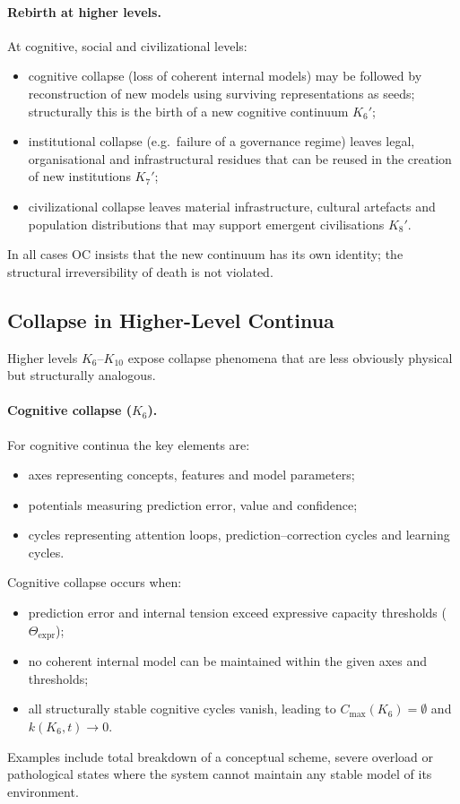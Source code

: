 \paragraph{Rebirth at higher levels.}
At cognitive, social and civilizational levels:
\begin{itemize}
  \item cognitive collapse (loss of coherent internal models) may be followed
        by reconstruction of new models using surviving representations as
        seeds; structurally this is the birth of a new cognitive continuum
        \(K_6'\);
  \item institutional collapse (e.g.\ failure of a governance regime) leaves
        legal, organisational and infrastructural residues that can be reused
        in the creation of new institutions \(K_7'\);
  \item civilizational collapse leaves material infrastructure, cultural
        artefacts and population distributions that may support emergent
        civilisations \(K_8'\).
\end{itemize}

In all cases OC insists that the new continuum has its own identity; the
structural irreversibility of death is not violated.

\subsection{Collapse in Higher-Level Continua}

Higher levels \(K_6\)–\(K_{10}\) expose collapse phenomena that are less
obviously physical but structurally analogous.

\paragraph{Cognitive collapse (\texorpdfstring{\(K_6\)}{K_6}).}
For cognitive continua the key elements are:
\begin{itemize}
  \item axes representing concepts, features and model parameters;
  \item potentials measuring prediction error, value and confidence;
  \item cycles representing attention loops, prediction--correction cycles
        and learning cycles.
\end{itemize}
Cognitive collapse occurs when:
\begin{itemize}
  \item prediction error and internal tension exceed expressive capacity
        thresholds (\(\Theta_{\mathrm{expr}}\));
  \item no coherent internal model can be maintained within the given axes
        and thresholds;
  \item all structurally stable cognitive cycles vanish, leading to
        \(C_{\max}(K_6)=\emptyset\) and \(k(K_6,t)\to 0\).
\end{itemize}
Examples include total breakdown of a conceptual scheme, severe overload or
pathological states where the system cannot maintain any stable model of its
environment.

